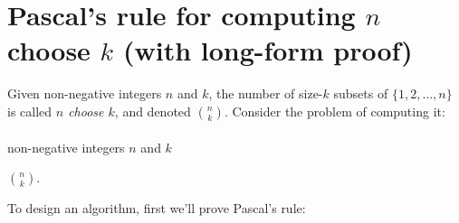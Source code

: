 
\newcommand{\calC}{{\cal C}}

\section{Pascal's rule for computing $n$ choose $k$ (with long-form proof)}\label{dp: sec: n choose k}

Given non-negative integers $n$ and $k$,
the number of size-$k$ subsets of $\{1,2,\ldots, n\}$
is called \emph{$n$ choose $k$}, and denoted $n\choose k$.
Consider the problem of computing it:

\paragraph{{}}

\begin{mylist}
\item[\bf input:]
  non-negative integers $n$ and $k$

\item[\bf output:] $n\choose k$.
\end{mylist}

To design an algorithm, first we'll prove Pascal's rule:

